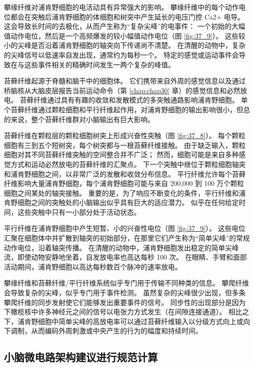 攀缘纤维对浦肯野细胞的电活动具有异常强大的影响。
攀缘纤维中的每个动作电位都会在突触后浦肯野细胞的体细胞和树突中产生延长的电压门控 Ca2+ 电导。
这会导致长时间的去极化，从而产生称为“复杂尖峰”的电事件：
一个初始的大幅值动作电位，然后是一个高频爆发的较小幅值动作电位（图 \ref{fig:37_9}）。
这些较小的尖峰是否沿着浦肯野细胞的轴突向下传递尚不清楚。
在清醒的动物中，复杂的尖峰信号以低速率自发出现，通常约为每秒一个。
特定的感觉或运动事件会导致在与这些事件相关的精确时间发生一两个复杂的峰值。


苔藓纤维起源于脊髓和脑干中的细胞体。
它们携带来自外周的感觉信息以及通过桥脑核从大脑皮层报告当前运动命令（第 \ref{chap:chap30} 章）的感觉信息和必然放电。
苔藓纤维通过具有有趣的收敛和发散模式的多突触通路影响浦肯野细胞。
单个苔藓纤维通过颗粒细胞和平行纤维起作用，对浦肯野细胞的输出影响很小，但总的来说，整个苔藓纤维群对小脑输出有巨大影响。


苔藓纤维在颗粒层的颗粒细胞树突上形成兴奋性突触（图 \ref{fig:37_8}）。
每个颗粒细胞有三到五个短树突，每个树突都与一根苔藓纤维接触。
由于缺乏输入，颗粒细胞对其不同苔藓纤维突触的空间整合并不广泛；
然而，细胞可能是来自多种感觉方式和运动必然放电的苔藓纤维的汇聚点。
下一个突触中继位于颗粒细胞轴突和浦肯野细胞之间，以非常广泛的发散和收敛分布信息。
平行纤维允许每个苔藓纤维影响大量浦肯野细胞，每个浦肯野细胞可能与来自 200,000 到 100 万个颗粒细胞之间某处的轴突接触。
重要的是，为了响应不断变化的条件，平行纤维和浦肯野细胞之间的突触处的小脑输出似乎具有巨大的适应潜力。
似乎在任何给定时间，这些突触中只有一小部分处于活动状态。


平行纤维在浦肯野细胞中产生短暂、小的兴奋性电位（图 \ref{fig:37_9}）。
这些电位汇聚在细胞体中并扩散到轴突的初始部分，在那里它们产生称为“简单尖峰”的常规动作电位，沿着轴突传播。
在清醒的动物中，浦肯野细胞发出稳定的简单尖峰流，即使动物安静地坐着，自发放电率也高达每秒 100 次。
在眼睛、手臂和面部活动期间，浦肯野细胞以高达每秒数百个脉冲的速率放电。


攀缘纤维和苔藓纤维/平行纤维系统似乎专门用于传输不同种类的信息。
攀爬纤维会导致复杂的尖峰，似乎专门用于事件检测。
虽然复杂的尖峰很少出现，但多条攀爬纤维的同步发射使它们能够发出重要事件的信号。
同步性的出现部分是因为下橄榄核中许多神经元之间的信号以电张力方式发生（在间隙连接通道）。
相比之下，浦肯野细胞中简单尖峰的高放电率可以通过苔藓纤维输入以分级方式向上或向下调制，从而编码外周刺激或中央产生的行为的幅度和持续时间。



\subsection{小脑微电路架构建议进行规范计算}

